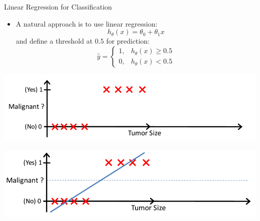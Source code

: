 \documentclass[serif, aspectratio=169]{beamer}
\begin{document}
    \begin{frame}{Linear Regression for Classification}
        \begin{itemize}
            \item A natural approach is to use linear regression:
            \[
                h_\theta(x) = \theta_0 + \theta_1 x
            \]
            and define a threshold at $0.5$ for prediction:
            \[
                \hat{y} =
                \begin{cases}
                    1, & h_\theta(x) \ge 0.5\\
                    0, & h_\theta(x) < 0.5
                \end{cases}
            \]
        \end{itemize}

        \vspace{0.5em}
        \begin{minipage}{0.48\linewidth}
            \centering
            \includegraphics[width=\linewidth]{pic/lrClassification1.png}
        \end{minipage}
        \hfill
        \begin{minipage}{0.48\linewidth}
            \centering
            \includegraphics[width=\linewidth]{pic/lrClassification3.png}
        \end{minipage}
    \end{frame}
\end{document}
